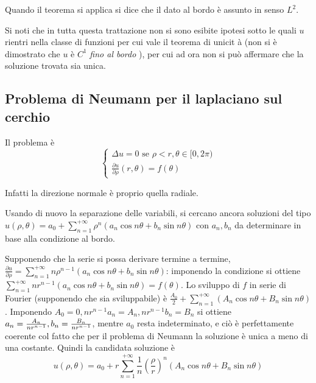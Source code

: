 \documentclass{article}
\begin{document}
Quando il teorema si applica si dice che il dato al bordo \`{e} assunto in
senso $L^{2}$.

Si noti che in tutta questa trattazione non si sono esibite ipotesi sotto le
quali $u$ rientri nella classe di funzioni per cui vale il teorema di unicit%
\`{a} (non si \`{e} dimostrato che $u$ \`{e} $C^{1}$ \textit{fino al bordo}%
), per cui ad ora non si pu\`{o} affermare che la soluzione trovata sia
unica.

\subsection{Problema di Neumann per il laplaciano sul cerchio}

Il problema \`{e}%
\begin{equation*}
\left\{ 
\begin{array}{c}
\Delta u=0\text{ se }\rho <r,\theta \in \lbrack 0,2\pi ) \\ 
\frac{\partial u}{\partial \rho }\left( r,\theta \right) =f\left( \theta
\right)%
\end{array}%
\right.
\end{equation*}

Infatti la direzione normale \`{e} proprio quella radiale.

Usando di nuovo la separazione delle variabili, si cercano ancora soluzioni
del tipo $u\left( \rho ,\theta \right) =a_{0}+\sum_{n=1}^{+\infty }\rho
^{n}\left( a_{n}\cos n\theta +b_{n}\sin n\theta \right) $ con $a_{n},b_{n}$
da determinare in base alla condizione al bordo.

Supponendo che la serie si possa derivare termine a termine, $\frac{\partial
u}{\partial \rho }=\sum_{n=1}^{+\infty }n\rho ^{n-1}\left( a_{n}\cos n\theta
+b_{n}\sin n\theta \right) $: imponendo la condizione si ottiene $%
\sum_{n=1}^{+\infty }nr^{n-1}\left( a_{n}\cos n\theta +b_{n}\sin n\theta
\right) =f\left( \theta \right) $. Lo sviluppo di $f$ in serie di Fourier
(supponendo che sia sviluppabile) \`{e} $\frac{A_{0}}{2}+\sum_{n=1}^{+\infty
}\left( A_{n}\cos n\theta +B_{n}\sin n\theta \right) $. Imponendo $%
A_{0}=0,nr^{n-1}a_{n}=A_{n},nr^{n-1}b_{n}=B_{n}$ si ottiene $a_{n}=\frac{%
A_{n}}{nr^{n-1}},b_{n}=\frac{B_{n}}{nr^{n-1}}$, mentre $a_{0}$ resta
indeterminato, e ci\`{o} \`{e} perfettamente coerente col fatto che per il
problema di Neumann la soluzione \`{e} unica a meno di una costante. Quindi
la candidata soluzione \`{e} 
\begin{equation*}
u\left( \rho ,\theta \right) =a_{0}+r\sum_{n=1}^{+\infty }\frac{1}{n}\left( 
\frac{\rho }{r}\right) ^{n}\left( A_{n}\cos n\theta +B_{n}\sin n\theta
\right)
\end{equation*}
\end{document}
